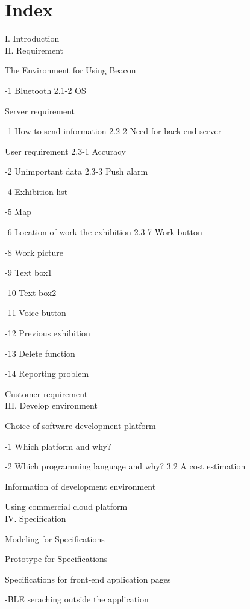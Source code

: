 \documentclass[conference]{IEEEtran}
\begin{document}
\section{Index}

I. Introduction\\


II. Requirement

 The Environment for Using Beacon

-1 Bluetooth 2.1-2 OS

 Server requirement

-1 How to send information 2.2-2 Need for back-end server

 User requirement 2.3-1 Accuracy

-2 Unimportant data 2.3-3 Push alarm

-4 Exhibition list

-5 Map

-6 Location of work the exhibition 2.3-7 Work button

-8 Work picture

-9 Text box1

-10 Text box2

-11 Voice button

-12 Previous exhibition

-13 Delete function

-14 Reporting problem

 Customer requirement\\

III. Develop environment

 Choice of software development platform

-1 Which platform and why?

-2 Which programming language and why? 3.2 A cost estimation

 Information of development environment

 Using commercial cloud platform\\

IV. Specification

 Modeling for Specifications 

 Prototype for Specifications

 Specifications for front-end application pages

\quad\quad-BLE seraching outside the application
\end{document}
